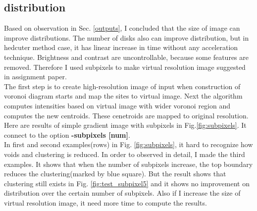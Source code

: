 \documentclass[11pt]{article}
\begin{document}
\subsection{distribution}
Based on observation in Sec. \ref{outputs}, I concluded that the size of image can improve distributions. The number of disks also can improve distribution, but in hedcuter method case, it has linear increase in time without any acceleration technique. Brightness and contrast are uncontrollable, because some features are removed. Therefore I used subpixels to make virtual resolution image suggested in assignment paper.\\
The first step is to create high-resolution image of input when construction of voronoi diagram starts and map the sites to virtual image. Next the algorithm computes intensities based on virtual image with wider voronoi region and computes the new centroids. These cenetroids are mapped to original resolution. Here are results of simple gradient image with subpixels in Fig.\ref{fig:subpixels}. It connect to the option \textbf{-subpixels [num]}.\\
In first and second examples(rows) in Fig. \ref{fig:subpixels}, it hard to recognize how voids and clustering is reduced. In order to observed in detail, I made the third examples. It shows that when the number of subpixels increase, the top boundary reduces the clustering(marked by blue square). But the result shows that clustering still exists in Fig. \ref{fig:test_subpixel5} and it shows no improvement on distribution over the certain number of subpixels. Also if I increase the size of virtual resolution image, it need more time to compute the results.
\end{document}
